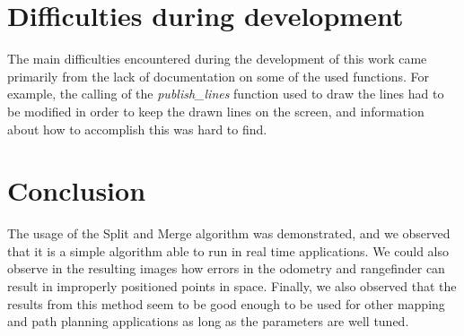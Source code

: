 \documentclass[11pt,oneside,a4paper]{article}
\begin{document}
\section{Difficulties during development}

The main difficulties encountered during the development of this work came primarily from the lack of documentation on some of the used functions. For example, the calling of the \textit{publish\_lines} function used to draw the lines had to be modified in order to keep the drawn lines on the screen, and information about how to accomplish this was hard to find. 


\section{Conclusion}

The usage of the Split and Merge algorithm was demonstrated, and we observed that it is a simple algorithm able to run in real time applications. We could also observe in the resulting images how errors in the odometry and rangefinder can result in improperly positioned points in space. Finally, we also observed that the results from this method seem to be good enough to be used for other mapping and path planning applications as long as the parameters are well tuned.












%






\end{document}

